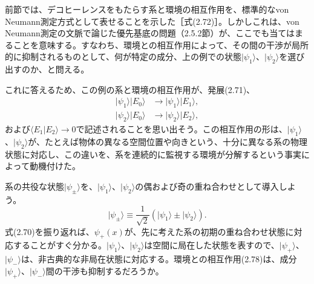 

前節では、デコヒーレンスをもたらす系と環境の相互作用を、標準的なvon Neumann測定方式として表せることを示した［式(2.72)］。しかしこれは、von Neumann測定の文脈で論じた優先基底の問題（2.5.2節）が、ここでも当てはまることを意味する。すなわち、環境との相互作用によって、その間の干渉が局所的に抑制されるものとして、何が特定の成分、上の例での状態$\lvert\psi_1\rangle$、$\lvert\psi_2\rangle$を選び出すのか、と問える。

これに答えるため、この例の系と環境の相互作用が、発展(2.71)、
\begin{align}\lvert\psi_1\rangle\lvert E_0\rangle&\longrightarrow\lvert\psi_1\rangle\lvert E_1\rangle,\tag{2.78a}\\\lvert\psi_2\rangle\lvert E_0\rangle&\longrightarrow\lvert\psi_2\rangle\lvert E_2\rangle,\tag{2.78b}\end{align}
および$\langle E_1\vert E_2\rangle\longrightarrow0$で記述されることを思い出そう。この相互作用の形は、$\lvert\psi_1\rangle$、$\lvert\psi_2\rangle$が、たとえば物体の異なる空間位置や向きという、十分に異なる系の物理状態に対応し、この違いを、系を連続的に監視する環境が分解するという事実によって動機付けた。

\hypertarget{srcpage:72}{}\label{srcpage:72}
系の共役な状態$\lvert\psi_\pm\rangle$を、$\lvert\psi_1\rangle$、$\lvert\psi_2\rangle$の偶および奇の重ね合わせとして導入しよう。
\begin{equation}\lvert\psi_\pm\rangle\equiv\frac1{\sqrt2}(\lvert\psi_1\rangle\pm\lvert\psi_2\rangle).\tag{2.79}\end{equation}
式(2.70)を振り返れば、$\psi_+(x)$が、先に考えた系の初期の重ね合わせ状態に対応することがすぐ分かる。$\lvert\psi_1\rangle$、$\lvert\psi_2\rangle$は空間に局在した状態を表すので、$\lvert\psi_+\rangle$、$\lvert\psi_-\rangle$は、非古典的な非局在状態に対応する。環境との相互作用(2.78)は、成分$\lvert\psi_+\rangle$、$\lvert\psi_-\rangle$間の干渉も抑制するだろうか。

